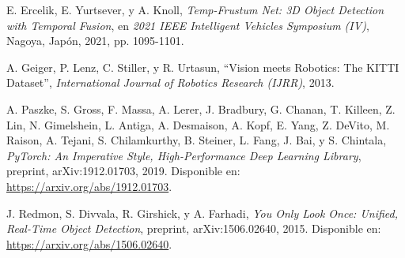 
\begin{thebibliography}{99}
	E. Ercelik, E. Yurtsever, y A. Knoll,
	\textit{Temp-Frustum Net: 3D Object Detection with Temporal Fusion},
	en \textit{2021 IEEE Intelligent Vehicles Symposium (IV)}, Nagoya, Japón, 2021, pp. 1095-1101.
	
	A. Geiger, P. Lenz, C. Stiller, y R. Urtasun,
	``Vision meets Robotics: The KITTI Dataset'',
	\textit{International Journal of Robotics Research (IJRR)}, 2013.
	
	A. Paszke, S. Gross, F. Massa, A. Lerer, J. Bradbury, G. Chanan, T. Killeen, Z. Lin, N. Gimelshein, L. Antiga, A. Desmaison, A. Kopf, E. Yang, Z. DeVito, M. Raison, A. Tejani, S. Chilamkurthy, B. Steiner, L. Fang, J. Bai, y S. Chintala,
	\textit{PyTorch: An Imperative Style, High-Performance Deep Learning Library},
	preprint, arXiv:1912.01703, 2019. Disponible en: \url{https://arxiv.org/abs/1912.01703}.
	
	J. Redmon, S. Divvala, R. Girshick, y A. Farhadi,
	\textit{You Only Look Once: Unified, Real-Time Object Detection},
	preprint, arXiv:1506.02640, 2015. Disponible en: \url{https://arxiv.org/abs/1506.02640}.
	
	
	

	
	
	
	
	
	
	
	
\end{thebibliography}





